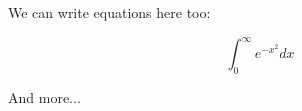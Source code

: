 We can write equations here too:

\begin{equation}
\int_0^\infty e^{-x^2} dx
\end{equation}

And more...